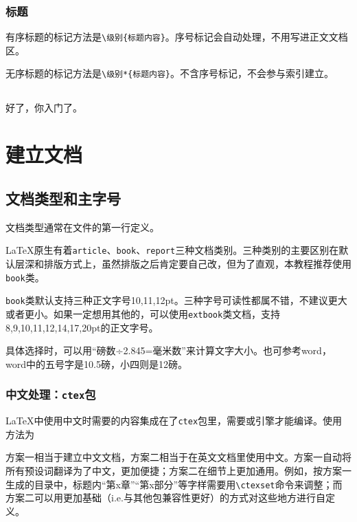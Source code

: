 \documentclass[10pt,openany]{book}
\begin{document}
\subsection{标题}

有序标题的标记方法是\texttt{\textbackslash{}级别\{标题内容\}}。序号标记会自动处理，不用写进正文文档区。

无序标题的标记方法是\texttt{\textbackslash{}级别*\{标题内容\}}。不含序号标记，不会参与索引建立。

\section*{}

好了，你入门了。

\chapter{建立文档}

\section{文档类型和主字号}

文档类型通常在文件的第一行定义。



{\LaTeX}原生有着\texttt{article}、\texttt{book}、\texttt{report}三种文档类别。三种类别的主要区别在默认层深和排版方式上，虽然排版之后肯定要自己改，但为了直观，本教程推荐使用\texttt{book}类。

\texttt{book}类默认支持三种正文字号10,11,12pt。三种字号可读性都属不错，不建议更大或者更小。如果一定想用其他的，可以使用\texttt{extbook}类文档，支持8,9,10,11,12,14,17,20pt的正文字号。

具体选择时，可以用“磅数÷2.845=毫米数”来计算文字大小。也可参考word，word中的五号字是10.5磅，小四则是12磅。

\subsection{中文处理：\texttt{ctex}包}

 {\LaTeX}中使用中文时需要的内容集成在了\texttt{ctex}包里，需要{\XeLaTeX}或{\LuaLaTeX}引擎才能编译。使用方法为



方案一相当于建立中文文档，方案二相当于在英文文档里使用中文。方案一自动将所有预设词翻译为了中文，更加便捷；方案二在细节上更加通用。例如，按方案一生成的目录中，标题内“第x章”“第x部分”等字样需要用\texttt{\textbackslash{}ctexset}命令来调整；而方案二可以用更加基础（i.e.与其他包兼容性更好）的方式对这些地方进行自定义。
\end{document}
